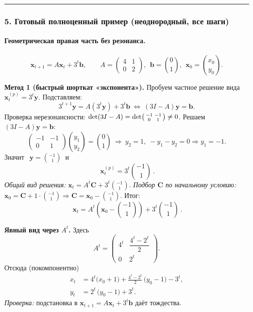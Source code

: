 \bigskip\hrule\bigskip

\subsubsection*{5. Готовый полноценный пример (неоднородный, все шаги)}

\paragraph{Геометрическая правая часть без резонанса.}
\[
\mathbf{x}_{t+1}=A\mathbf{x}_t+3^t\mathbf{b},\qquad
A=\begin{pmatrix}4&1\\ 0&2\end{pmatrix},\ \ \mathbf{b}=\binom{0}{1},\ \ \mathbf{x}_0=\binom{x_0}{y_0}.
\]

\textbf{Метод 1 (быстрый шорткат «экспонента»).}
Пробуем частное решение вида \(\mathbf{x}^{(p)}_t=3^t\mathbf{y}\).
Подставляем:
\[
3^{t+1}\mathbf{y}=A(3^t\mathbf{y})+3^t\mathbf{b}
\ \Leftrightarrow\
(3I-A)\mathbf{y}=\mathbf{b}.
\]
Проверка нерезонансности: \(\det(3I-A)=\det\begin{psmallmatrix}-1&-1\\ 0&1\end{psmallmatrix}\neq0\).
Решаем \((3I-A)\mathbf{y}=\mathbf{b}\):
\[
\begin{pmatrix}-1&-1\\ 0&1\end{pmatrix}\binom{y_1}{y_2}=\binom{0}{1}
\ \Rightarrow\ y_2=1,\; -y_1-y_2=0\Rightarrow y_1=-1.
\]
Значит \(\ \boxed{\ \mathbf{y}=\binom{-1}{\ 1}\ }\) и
\[
\boxed{\ \mathbf{x}^{(p)}_t=3^t\binom{-1}{\ 1}\ }.
\]
\emph{Общий вид решения:} \(\mathbf{x}_t=A^t\mathbf{C}+3^t\binom{-1}{1}\).
\emph{Подбор \(\mathbf{C}\) по начальному условию:} \(\mathbf{x}_0=\mathbf{C}+1\cdot\binom{-1}{1}\Rightarrow \mathbf{C}=\mathbf{x}_0-\binom{-1}{1}\).
Итог:
\[
\boxed{\ \mathbf{x}_t=A^t\!\left(\mathbf{x}_0-\binom{-1}{1}\right)+3^t\binom{-1}{1}\ }.
\]

\textbf{Явный вид через \(A^t\).}
Здесь
\[
A^t=\begin{pmatrix}4^t&\dfrac{4^t-2^t}{2}\\[4pt]0&2^t\end{pmatrix}.
\]
Отсюда (покомпонентно)
\[
\boxed{
\begin{aligned}
x_t&=4^t\!\Big(x_0+1\Big)+\frac{4^t-2^t}{2}\,\Big(y_0-1\Big)-3^t,\\[2pt]
y_t&=2^t\,\Big(y_0-1\Big)+3^t.
\end{aligned}}
\]
\emph{Проверка:} подстановка в \(\mathbf{x}_{t+1}=A\mathbf{x}_t+3^t\mathbf{b}\) даёт тождества.
